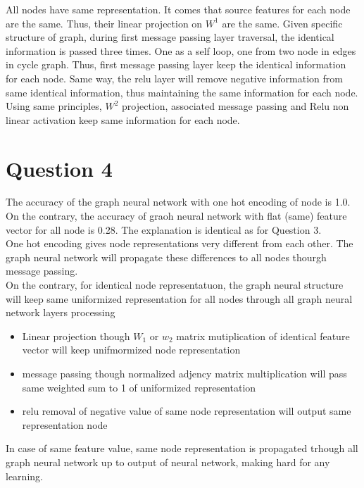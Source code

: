 \documentclass[a4paper]{article}
\begin{document}
All nodes have same representation. It comes that source features for each node are the same. Thus, their linear projection on $W^{1}$ are the same. Given specific structure of graph, during first message passing layer traversal, the identical information is passed three times. One as a self loop, one from two node in edges  in cycle graph. Thus, first message passing layer keep the identical information for each node. Same way, the relu layer will remove negative information from same identical information, thus maintaining the same information for each node.\\
Using same principles, $W^{2}$ projection, associated message passing and Relu non linear activation keep same information for each node.

\section{Question 4}

The accuracy of the graph neural network with one hot encoding of node is 1.0. On the contrary, the accuracy of graoh neural network with flat (same) feature vector for all node is 0.28. The explanation is identical as for Question 3.\\
One hot encoding gives node representations very different from each other. The graph neural network will propagate these differences to all nodes thourgh message passing.\\
On the contrary, for identical node representatuon,  the graph neural structure will keep same uniformized representation for all nodes through all graph neural network layers processing
\begin{itemize}
\item Linear projection though $W_{1}$ or $w_{2}$ matrix mutiplication of identical feature vector will keep unifmormized node representation
\item message passing though normalized adjency matrix multiplication will pass same weighted sum to 1 of uniformized representation 
\item relu removal of negative value of same node representation will output same representation node
\end{itemize}

In case of same feature value, same node representation is propagated trhough all graph neural network up to output of neural network, making hard for any learning.


\end{document}

